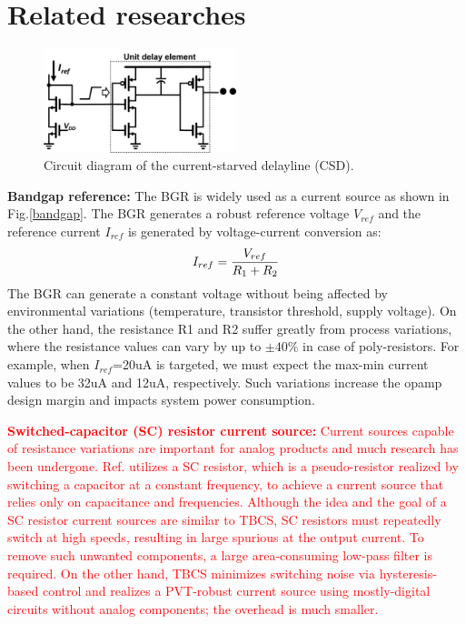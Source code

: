 \documentclass[paper]{ieice}
\begin{document}
\section{Related researches}


\begin{figure}[!t]
\centering
 \includegraphics[width=0.5\textwidth]{figs/inv.png}
  \caption{Circuit diagram of the current-starved delayline (CSD).}
\label{inv}
\end{figure}

\qquad \textbf{Bandgap reference:} The BGR is widely used as a current source as shown in Fig.\ref{bandgap}. The BGR generates a robust reference voltage $V_{ref}$ and the reference current $I_{ref}$ is generated by voltage-current conversion as:
\begin{eqnarray}
    \centering
    I_{ref} = \frac{V_{ref}}{R_1 + R_2}
    \label{sar13b}
\end{eqnarray}
The BGR can generate a constant voltage without being affected by environmental variations (temperature, transistor threshold, supply voltage). On the other hand, the resistance R1 and R2 suffer greatly from process variations, where the resistance values can vary by up to $\pm 40\%$ in case of poly-resistors. For example, when $I_{ref}$=20uA is targeted, we must expect the max-min current values to be 32uA and 12uA, respectively. Such variations increase the opamp design margin and impacts system power consumption.

\textcolor{red}{\textbf{Switched-capacitor (SC) resistor current source:} Current sources capable of resistance variations are important for analog products and much research has been undergone. Ref.\cite{chuanyang,ron} utilizes a SC resistor, which is a pseudo-resistor realized by switching a capacitor at a constant frequency, to achieve a current source that relies only on capacitance and frequencies. Although the idea and the goal of a SC resistor current sources are similar to TBCS, SC resistors must repeatedly switch at high speeds, resulting in large spurious at the output current. To remove such unwanted components, a large area-consuming low-pass filter is required. On the other hand, TBCS minimizes switching noise via hysteresis-based control and realizes a PVT-robust current source using mostly-digital circuits without analog components; the overhead is much smaller.}
\end{document}
